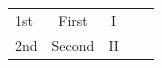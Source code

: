 \documentclass{article}\usepackage{array,boldline}
\begin{document}
\begin{tabular}{V{2.7}c|c|cV{2.7}}
1st &First  &I  \\
2nd &Second &II \\
\end{tabular}
\end{document}
